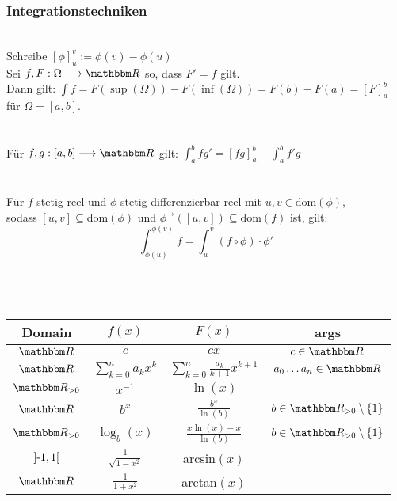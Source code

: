 \subsubsection*{Integrationstechniken}
 \\
Schreibe \([\phi]_u^v := \phi(v) - \phi(u)\) \\
Sei \(f,F: \Omega \longrightarrow \R\) so, dass \(F' = f\) gilt. \\
Dann gilt: \(\int f = F(\sup(\Omega)) - F(\inf(\Omega)) = F(b) - F(a) = [F]_a^b\) für \(\Omega = [a,b]\). \\ \\
 \\
Für \(f,g : [a,b] \longrightarrow \R\) gilt: \(\int_{a}^{b}fg' = [fg]_a^b - \int_{a}^{b}f'g\) \\ \\
 \\
Für \(f\) stetig reel und \(\phi\) stetig differenzierbar reel mit \(u,v \in \text{dom}(\phi)\),\\
sodass \([u,v] \subseteq \text{dom}(\phi)\) und \(\phi^\rightarrow([u,v]) \subseteq \text{dom}(f)\) ist, gilt:
\[\int_{\phi(u)}^{\phi(v)}f = \int_{u}^{v}(f \circ \phi) \cdot \phi'\] \\
 \\ \\
\begin{tabular}{ c | c | c | c }
    \hline
    Domain & \(f(x)\) & \(F(x)\) & args \\
    \hline
    \(\R\) & \(c\) & \(cx\) & \(c \in \R\) \\
    \(\R\) & \(\sum_{k=0}^{n}a_kx^k\) & \(\sum_{k=0}^{n}\frac{a_k}{k+1}x^{k+1}\) & \(a_0 \dots a_n \in \R\) \\
    \(\R_{> 0}\) & \(x^{-1}\) & \(\ln(x)\) & \\
    \(\R\) & \(b^x\) & \(\frac{b^x}{\ln(b)}\) & \(b \in \R_{>0} \setminus \{1\}\) \\
    \(\R_{> 0}\) & \(\log_b(x)\) & \(\frac{x\ln(x) - x}{\ln(b)}\) & \(b \in \R_{>0} \setminus \{1\}\) \\
    \(]\text{-} 1, 1[\) & \(\frac{1}{\sqrt{1-x^2}}\) & arcsin\((x)\) & \\
    \(\R\) & \(\frac{1}{1+x^2}\) & arctan\((x)\) & \\
\end{tabular}
